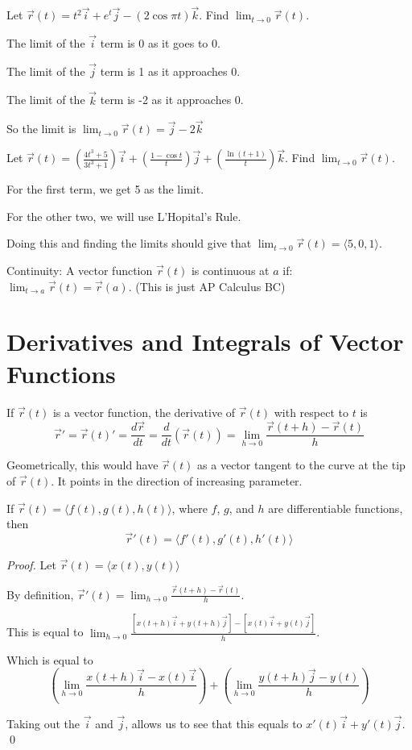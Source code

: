 \documentclass[../calc3.tex]{subfiles}
\begin{document}
\begin{example}
    Let $\vec{r}(t)=t^2\vec{i}+e^t\vec{j}-(2\cos \pi t)\vec{k}$. Find $\lim_{t\to 0}\vec{r}(t)$.

    The limit of the $\vec{i}$ term is 0 as it goes to 0.

    The limit of the $\vec{j}$ term is 1 as it approaches 0.

    The limit of the $\vec{k}$ term is -2 as it approaches 0.

    So the limit is $\lim_{t\to 0} \vec{r}(t) = \vec{j}-2\vec{k}$
\end{example}

\begin{example}
    Let $\vec{r}(t) = \left(\frac{4t^3+5}{3t^3+1}\right)\vec{i}+\left(\frac{1-\cos t}{t}\right)\vec{j}+\left(\frac{\ln(t+1)}{t}\right)\vec{k}$. Find $\lim_{t\to 0}\vec{r}(t)$.

    For the first term, we get 5 as the limit.

    For the other two, we will use L'Hopital's Rule.

    Doing this and finding the limits should give that $\lim_{t\to 0}\vec{r}(t) = \langle 5,0,1\rangle$.
\end{example}

Continuity: A vector function $\vec{r}(t)$ is continuous at $a$ if: $\lim_{t\to a} \vec{r}(t)=\vec{r}(a)$. (This is just AP Calculus BC)

\section{Derivatives and Integrals of Vector Functions}
\begin{definition}
    If $\vec{r}(t)$ is a vector function, the derivative of $\vec{r}(t)$ with respect to $t$ is 
    \[ \vec{r}' = \vec{r}(t)'=\frac{d\vec{r}}{dt}=\frac{d}{dt}(\vec{r}(t)) = \lim_{h\to 0}\frac{\vec{r}(t+h)-\vec{r}(t)}{h} \]
\end{definition}

Geometrically, this would have $\vec{r}(t)$ as a vector tangent to the curve at the tip of $\vec{r}(t)$. It points in the direction of increasing parameter.

\begin{theorem}
    If $\vec{r}(t)=\langle f(t),g(t),h(t)\rangle$, where $f$, $g$, and $h$ are differentiable functions, then 
    \[ \vec{r}'(t)=\langle f'(t),g'(t),h'(t)\rangle \]
\end{theorem}
\begin{proof}
    Let $\vec{r}(t)=\langle x(t),y(t)\rangle$

    By definition, $\vec{r}'(t)=\lim_{h\to 0}\frac{\vec{r}(t+h)-\vec{r}(t)}{h}$.

    This is equal to $\lim_{h\to 0}\frac{[x(t+h)\vec{i}+y(t+h)\vec{j}]-[x(t)\vec{i}+y(t)\vec{j}]}{h}$.

    Which is equal to 
    \[ \left(\lim_{h\to 0}\frac{x(t+h)\vec{i}-x(t)\vec{i}}{h}\right) + \left(\lim_{h\to 0}\frac{y(t+h)\vec{j}-y(t)}{h}\right) \]

    Taking out the $\vec{i}$ and $\vec{j}$, allows us to see that this equals to $x'(t)\vec{i}+y'(t)\vec{j}$. \qed
\end{proof}
\end{document}
